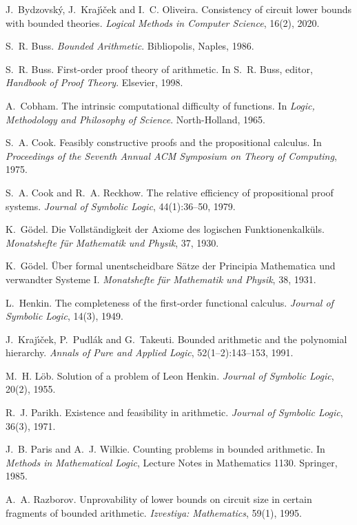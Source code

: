
J.~Bydzovsk\'y, J.~Kraj\'{\i}\v{c}ek and I.~C. Oliveira.
\newblock Consistency of circuit lower bounds with bounded theories.
\newblock \emph{Logical Methods in Computer Science}, 16(2), 2020.

S.~R. Buss.
\newblock \emph{Bounded Arithmetic}.
\newblock Bibliopolis, Naples, 1986.

S.~R. Buss.
\newblock First-order proof theory of arithmetic.
\newblock In S.~R. Buss, editor, \emph{Handbook of Proof Theory}. Elsevier, 1998.

A.~Cobham.
\newblock The intrinsic computational difficulty of functions.
\newblock In \emph{Logic, Methodology and Philosophy of Science}. North-Holland, 1965.

S.~A. Cook.
\newblock Feasibly constructive proofs and the propositional calculus.
\newblock In \emph{Proceedings of the Seventh Annual ACM Symposium on Theory of Computing}, 1975.

S.~A. Cook and R.~A. Reckhow.
\newblock The relative efficiency of propositional proof systems.
\newblock \emph{Journal of Symbolic Logic}, 44(1):36--50, 1979.

K.~G\"odel.
\newblock Die Vollst\"andigkeit der Axiome des logischen Funktionenkalk\"uls.
\newblock \emph{Monatshefte f\"ur Mathematik und Physik}, 37, 1930.

K.~G\"odel.
\newblock \"Uber formal unentscheidbare S\"atze der Principia Mathematica und verwandter Systeme I.
\newblock \emph{Monatshefte f\"ur Mathematik und Physik}, 38, 1931.

L.~Henkin.
\newblock The completeness of the first-order functional calculus.
\newblock \emph{Journal of Symbolic Logic}, 14(3), 1949.

J.~Kraj\'{\i}\v{c}ek, P.~Pudl\'ak and G.~Takeuti.
\newblock Bounded arithmetic and the polynomial hierarchy.
\newblock \emph{Annals of Pure and Applied Logic}, 52(1--2):143--153, 1991.

M.~H. L\"ob.
\newblock Solution of a problem of Leon Henkin.
\newblock \emph{Journal of Symbolic Logic}, 20(2), 1955.

R.~J. Parikh.
\newblock Existence and feasibility in arithmetic.
\newblock \emph{Journal of Symbolic Logic}, 36(3), 1971.

J.~B. Paris and A.~J. Wilkie.
\newblock Counting problems in bounded arithmetic.
\newblock In \emph{Methods in Mathematical Logic}, Lecture Notes in Mathematics 1130. Springer, 1985.

A.~A. Razborov.
\newblock Unprovability of lower bounds on circuit size in certain fragments of bounded arithmetic.
\newblock \emph{Izvestiya: Mathematics}, 59(1), 1995.
